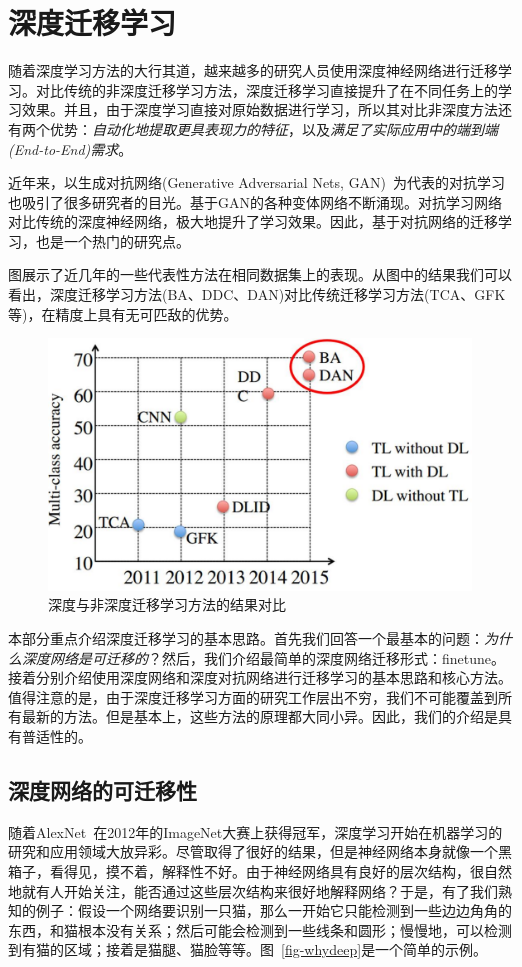 \newpage
\section{深度迁移学习}

随着深度学习方法的大行其道，越来越多的研究人员使用深度神经网络进行迁移学习。对比传统的非深度迁移学习方法，深度迁移学习直接提升了在不同任务上的学习效果。并且，由于深度学习直接对原始数据进行学习，所以其对比非深度方法还有两个优势：\textit{自动化地提取更具表现力的特征}，以及\textit{满足了实际应用中的端到端(End-to-End)需求}。

近年来，以生成对抗网络(Generative Adversarial Nets, GAN)~\cite{goodfellow2014generative}为代表的对抗学习也吸引了很多研究者的目光。基于GAN的各种变体网络不断涌现。对抗学习网络对比传统的深度神经网络，极大地提升了学习效果。因此，基于对抗网络的迁移学习，也是一个热门的研究点。

图展示了近几年的一些代表性方法在相同数据集上的表现。从图中的结果我们可以看出，深度迁移学习方法(BA、DDC、DAN)对比传统迁移学习方法(TCA、GFK等)，在精度上具有无可匹敌的优势。

\begin{figure}[htbp]
	\centering
	\includegraphics[scale=0.42]{./figures/fig-deep-compare.pdf}
	\caption{深度与非深度迁移学习方法的结果对比}
	\label{fig-deep}
\end{figure}

本部分重点介绍深度迁移学习的基本思路。首先我们回答一个最基本的问题：\textit{为什么深度网络是可迁移的}？然后，我们介绍最简单的深度网络迁移形式：finetune。接着分别介绍使用深度网络和深度对抗网络进行迁移学习的基本思路和核心方法。值得注意的是，由于深度迁移学习方面的研究工作层出不穷，我们不可能覆盖到所有最新的方法。但是基本上，这些方法的原理都大同小异。因此，我们的介绍是具有普适性的。

\subsection{深度网络的可迁移性}
随着AlexNet~\cite{krizhevsky2012imagenet}在2012年的ImageNet大赛上获得冠军，深度学习开始在机器学习的研究和应用领域大放异彩。尽管取得了很好的结果，但是神经网络本身就像一个黑箱子，看得见，摸不着，解释性不好。由于神经网络具有良好的层次结构，很自然地就有人开始关注，能否通过这些层次结构来很好地解释网络？于是，有了我们熟知的例子：假设一个网络要识别一只猫，那么一开始它只能检测到一些边边角角的东西，和猫根本没有关系；然后可能会检测到一些线条和圆形；慢慢地，可以检测到有猫的区域；接着是猫腿、猫脸等等。图~\ref{fig-whydeep}是一个简单的示例。


